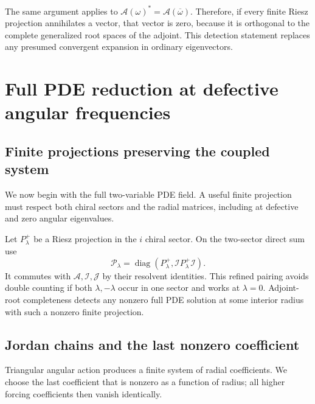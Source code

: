 \documentclass[11pt,a4paper]{article}
\begin{document}
The same argument applies to
\(\mathcal A(\omega)^*=\mathcal A(\overline\omega)\). Therefore, if
every finite Riesz projection annihilates a vector, that vector is zero,
because it is orthogonal to the complete generalized root spaces of the
adjoint. This detection statement replaces any presumed convergent
expansion in ordinary eigenvectors.

\section{Full PDE reduction at defective angular
frequencies}\label{full-pde-reduction-at-defective-angular-frequencies}

\subsection{Finite projections preserving the coupled system}\label{readable-chiral-projection}

We now begin with the full two-variable PDE field. A useful finite projection must respect both chiral sectors and the radial matrices, including at defective and zero angular eigenvalues.

Let \(P_\lambda^+\) be a Riesz projection in the \(i\) chiral sector. On
the two-sector direct sum use \[
 \mathcal P_\lambda=
 \operatorname{diag}(P_\lambda^+,\mathcal I P_\lambda^+\mathcal I).
 \tag{21}
\] It commutes with \(\mathcal A,\mathcal I,\mathcal J\) by their
resolvent identities. This refined pairing avoids double counting if
both \(\lambda,-\lambda\) occur in one sector and works at
\(\lambda=0\). Adjoint-root completeness detects any nonzero full PDE
solution at some interior radius with such a nonzero finite projection.

\subsection{Jordan chains and the last nonzero coefficient}\label{readable-jordan-pair}

Triangular angular action produces a finite system of radial coefficients. We choose the last coefficient that is nonzero as a function of radius; all higher forcing coefficients then vanish identically.
\end{document}
